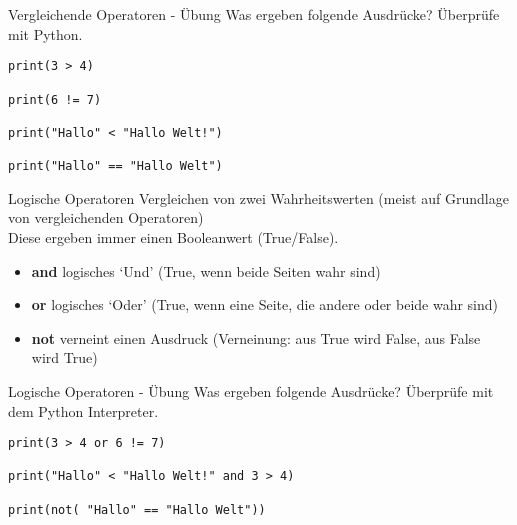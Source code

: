 \begin{frame}[fragile]{Vergleichende Operatoren - Übung}
Was ergeben folgende Ausdrücke? Überprüfe mit Python.

\begin{lstlisting} 
print(3 > 4) 

print(6 != 7)

print("Hallo" < "Hallo Welt!") 

print("Hallo" == "Hallo Welt")

\end{lstlisting}
\end{frame}



\begin{frame}[fragile]{Logische Operatoren}
Vergleichen von zwei Wahrheitswerten (meist auf Grundlage von vergleichenden Operatoren)\\
Diese ergeben immer einen Booleanwert (True/False).

\begin{itemize}	
\item \textbf{and}  logisches `Und' (True, wenn beide Seiten wahr sind)
\item \textbf{or}  logisches `Oder' (True, wenn eine Seite, die andere oder beide wahr sind)
\item \textbf{not}  verneint einen Ausdruck (Verneinung: aus True wird False, aus False wird True)
\end{itemize}
\end{frame}

\begin{frame}[fragile]{Logische Operatoren - Übung}
Was ergeben folgende Ausdrücke? Überprüfe mit dem Python Interpreter.

\begin{lstlisting} 
print(3 > 4 or 6 != 7)

print("Hallo" < "Hallo Welt!" and 3 > 4)

print(not( "Hallo" == "Hallo Welt"))
\end{lstlisting}
\end{frame}







